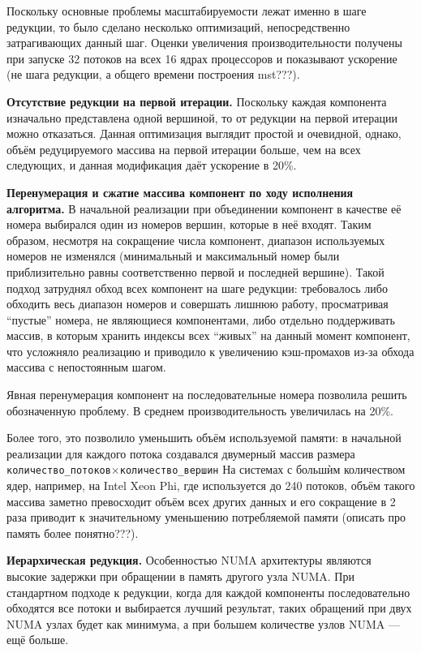 \documentclass{article}
\begin{document}
Поскольку основные проблемы масштабируемости лежат именно в шаге редукции, то было сделано несколько оптимизаций, непосредственно затрагивающих данный шаг. Оценки увеличения производительности получены при запуске 32 потоков на всех 16 ядрах процессоров и показывают ускорение (не шага редукции, а общего времени построения mst???).

\textbf{Отсутствие редукции на первой итерации.}
Поскольку каждая компонента изначально представлена одной вершиной, то от редукции на первой итерации можно отказаться. Данная оптимизация выглядит простой и очевидной, однако, объём редуцируемого массива на первой итерации больше, чем на всех следующих, и данная модификация даёт ускорение в 20\%.

\textbf{Перенумерация и сжатие массива компонент по ходу исполнения алгоритма.}
В начальной реализации при объединении компонент в качестве её номера выбирался один из номеров вершин, которые в неё входят. Таким образом, несмотря на сокращение числа компонент, диапазон используемых номеров не изменялся (минимальный и максимальный номер были приблизительно равны соответственно первой и последней вершине). Такой подход затруднял обход всех компонент на шаге редукции: требовалось либо обходить весь диапазон номеров и совершать лишнюю работу, просматривая ``пустые'' номера, не являющиеся компонентами, либо отдельно поддерживать массив, в которым хранить индексы всех ``живых'' на данный момент компонент, что усложняло реализацию и приводило к увеличению кэш-промахов из-за обхода массива с непостоянным шагом.

Явная перенумерация компонент на последовательные номера позволила решить обозначенную проблему. В среднем производительность увеличилась на 20\%.

Более того, это позволило уменьшить объём используемой памяти: в начальной реализации для каждого потока создавался двумерный массив размера \texttt{количество\_потоков}$\times$\texttt{количество\_вершин}
На системах с больш\`{и}м количеством ядер, например, на Intel Xeon Phi, где используется до 240 потоков, объём такого массива заметно превосходит объём всех других данных и его сокращение в 2 раза приводит к значительному уменьшению потребляемой памяти (описать про память более понятно???).

\textbf{Иерархическая редукция.}
Особенностью NUMA архитектуры являются высокие задержки при обращении в память другого узла NUMA.
При стандартном подходе к редукции, когда для каждой компоненты последовательно обходятся все потоки и выбирается лучший результат, таких обращений при двух NUMA узлах будет как минимума, а при большем количестве узлов NUMA --- ещё больше.
\end{document}
